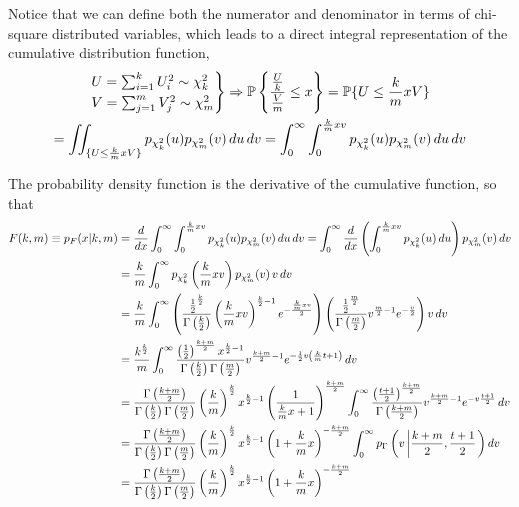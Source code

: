 \documentclass[12pt, twoside, draft]{article}
\begin{document}
Notice that we can define both the numerator and denominator in terms of chi-square distributed variables, which leads to a direct integral representation of the cumulative distribution function,
\begin{multline}
\begin{rcases}
U = \sum_{i=1}^k U_i^2 \sim \chi^2_k \\
V = \sum_{j=1}^m V_j^2 \sim \chi^2_m
\end{rcases} \Rightarrow
\mathbb{P}\left\{ \frac{\frac{U}{k}}{\frac{V}{m}} \leq x\right\} = \mathbb{P}\{U \leq \frac{k}{m} xV\}  \\
= \iint_{\{U \leq \frac{k}{m} xV\}} p_{\chi^2_k}(u) p_{\chi^2_m}(v) \,du\,dv = \int_0^\infty \int_0^{\frac{k}{m}xv}  p_{\chi^2_k}(u) p_{\chi^2_m}(v) \,du\,dv
\end{multline}

The probability density function is the derivative of the cumulative function, so that
\begin{align}
F(k,m) \equiv p_F(x|k,m) &= \frac{d}{dx} \int_0^\infty \int_0^{\frac{k}{m}xv}  p_{\chi^2_k}(u) p_{\chi^2_m}(v) \,du\,dv = \int_0^\infty \frac{d}{dx}\left( \int_0^{\frac{k}{m}xv} p_{\chi^2_k}(u) \,du \right) p_{\chi^2_m}(v)\,dv \notag \\
&= \frac{k}{m} \int_0^\infty p_{\chi_k^2}\left(\frac{k}{m}xv\right) p_{\chi_m^2}(v)\,v\,dv \notag \\
&=\frac{k}{m} \int_0^\infty \left( \frac{\frac{1}{2}^{\frac{k}{2}}}{\Gamma\left( \frac{k}{2}\right)}  \left( \frac{k}{m} xv \right)^{\frac{k}{2} - 1} e^{-\frac{\frac{k}{m}xv}{2}}  \right) 
\left( \frac{\frac{1}{2}^{\frac{m}{2}}}{\Gamma\left( \frac{m}{2}\right)} v^{\frac{m}{2} -1} e^{-\frac{v}{2}}\right)v\,dv \notag \\
&= \frac{k^{\frac{k}{2}}}{m} \int_0^\infty \frac{\left(\frac{1}{2}\right)^{\frac{k+m}{2}} x^{\frac{k}{2}-1}}{\Gamma\left( \frac{k}{2}\right) \Gamma \left( \frac{m}{2}\right)} v^{\frac{k+m}{2}-1} e^{-\frac{1}{2}v\left(\frac{k}{m}t+1\right)}\,dv \notag \\
&= \frac{\Gamma\left( \frac{k+m}{2} \right)}{\Gamma \left( \frac{k}{2} \right) \Gamma \left( \frac{m}{2} \right)} \left( \frac{k}{m} \right)^{\frac{k}{2}} x^{\frac{k}{2}-1} \left( \frac{1}{\frac{k}{m}x+1} \right)^{\frac{k+m}{2}} \int_0^\infty\frac{ \left( \frac{t+1}{2}\right)^{\frac{k+m}{2}}}{\Gamma \left( \frac{k+m}{2} \right)} v^{\frac{k+m}{2}-1} e^{-v\frac{t+1}{2}}  \,dv \notag \\
&= \frac{\Gamma\left( \frac{k+m}{2} \right)}{\Gamma \left( \frac{k}{2} \right) \Gamma \left( \frac{m}{2} \right)} \left( \frac{k}{m} \right)^{\frac{k}{2}} x^{\frac{k}{2}-1} \left( 1+\frac{k}{m}x \right)^{-\frac{k+m}{2}} \int_0^\infty p_{\Gamma}\left(v\left|\frac{k+m}{2},\frac{t+1}{2}\right.\right)dv \notag \\
&= \frac{\Gamma\left( \frac{k+m}{2} \right)}{\Gamma \left( \frac{k}{2} \right) \Gamma \left( \frac{m}{2} \right)} \left( \frac{k}{m} \right)^{\frac{k}{2}} x^{\frac{k}{2}-1} \left( 1+\frac{k}{m}x \right)^{-\frac{k+m}{2}}
\end{align}
\end{document}
